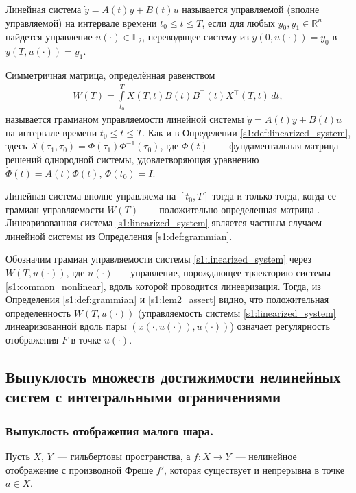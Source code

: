 \documentclass[../main.tex]{subfiles}
\begin{document}
\begin{definition}
	Линейная система $\dot{y} = A(t) y + B(t) u $ называется управляемой (вполне управляемой) на интервале времени $ t_0 \leqslant t \leqslant T $, если для любых $y_0, y_1 \in \mathbb{R}^n$ найдется управление $u(\cdot) \in \mathbb{L}_2$, переводящее систему из $y(0, u(\cdot)) = y_0 $ в $y(T, u(\cdot)) = y_1 $.
\end{definition}
 
\begin{definition}\label{s1:def:grammian}
 Симметричная матрица, определённая равенством
 \begin{gather*}
 W(T) = \int\limits_{t_0}^{T}X(T,t)B(t)B^{\top}(t)X^{\top}(T,t) \, dt,
 \end{gather*}
 называется грамианом управляемости линейной системы $\dot{y} = A(t) y + B(t) u $ на интервале времени $ t_0 \leqslant t \leqslant T $.
 Как и в Определении \ref{s1:def:linearized_system}, здесь $ X(\tau_1,\tau_0)= \Phi(\tau_1) \Phi^{-1}(\tau_0) $, где $\Phi(t) $ ~--- фундаментальная матрица решений однородной системы, удовлетворяющая уравнению $ \dot{\Phi}(t) = A(t) \Phi(t)$, $ \Phi(t_0) = I $.
\end{definition}
 
Линейная система вполне управляема на $ [t_0, T] $ тогда и только тогда, когда ее грамиан управляемости $W(T)$ ~--- положительно определенная матрица \cite[c. 176]{Chen}.
Линеаризованная система \eqref{s1:linearized_system} является частным случаем линейной системы из Определения \ref{s1:def:grammian}. 
 
Обозначим грамиан управляемости системы \eqref{s1:linearized_system} через $W(T,u(\cdot))$, где $u(\cdot)$~--- управление, порождающее траекторию системы \eqref{s1:common_nonlinear}, вдоль которой проводится линеаризация.
Тогда, из Определения \ref{s1:def:grammian} и \eqref{s1:lem2_assert} видно, что положительная определенность $W(T,u(\cdot))$ (управляемость системы \eqref{s1:linearized_system} линеаризованной вдоль пары $\left( x(\cdot,u(\cdot)),u(\cdot)\right) $) означает регулярность отображения $F$ в точке $u(\cdot) $. 
 
\subsection{Выпуклость множеств достижимости нелинейных систем с интегральными ограничениями}
\subsubsection{Выпуклость отображения малого шара.}
Пусть $X$, $Y$~--- гильбертовы пространства, а $f: X \rightarrow Y$~--- нелинейное отображение с производной Фреше $f'$, которая существует и непрерывна в точке $a \in X$.
 
\end{document}
